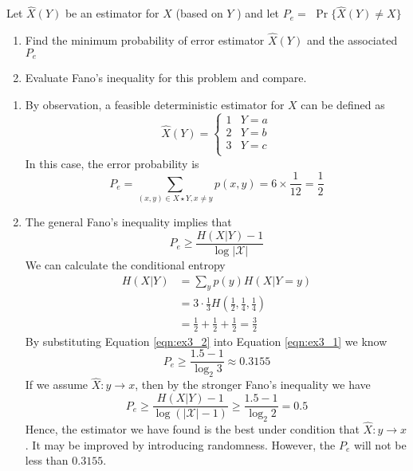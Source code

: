 \begin{exercise}[Fano]
{  Let $\hat{X}(Y)$ be an estimator for $X$ (based on $Y$ ) and let $P_{e}=$ $\operatorname{Pr}\{\hat{X}(Y) \neq X\}$
  \begin{enumerate}
    \item Find the minimum probability of error estimator $\hat{X}(Y)$ and the associated $P_{e}$
    \item Evaluate Fano's inequality for this problem and compare.
  \end{enumerate}
  }
  \begin{solution}
    \begin{enumerate}
      \item {
        By observation, a feasible deterministic estimator for $X$ can be defined as
        \begin{equation}
          \hat{X}(Y) = \left\{\begin{array}{ll}
            1 & Y = a \\
            2 & Y = b \\
            3 & Y = c \\           
          \end{array}  \right.
        \end{equation}
        In this case, the error probability is 
        $$ P_e = \sum_{(x,y)\in {X \star Y}, x \neq y} p(x,y) = 6 \times \frac{1}{12} = \frac{1}{2}$$
      }
      \item {
        The general Fano's inequality implies that
      \begin{equation}P_{e} \geqslant \frac{H(X | Y)-1}{\log |\mathcal{X}|} \label{eqn:ex3_1}\end{equation}
        We can calculate the conditional entropy
        \begin{equation}
          \begin{aligned}
            H(X|Y) &= \sum_{y} p(y) H(X|Y=y) \\
            &= 3 \cdot \frac{1}{3} H(\frac{1}{2},\frac{1}{4},\frac{1}{4}) \\
            &=  \frac{1}{2} +  \frac{1}{2} +  \frac{1}{2} = \frac{3}{2}
          \end{aligned}
          \label{eqn:ex3_2}
        \end{equation}
        By substituting Equation \ref{eqn:ex3_2} into Equation \ref{eqn:ex3_1} we know
        $$P_e \ge \frac{1.5 - 1}{\log_2 3} \approx 0.3155$$
        If we assume $\hat{X}: y \rightarrow x$, then by the stronger Fano's inequality we have
        $$P_e \ge \frac{H(X | Y)-1}{\log (|\mathcal{X}|-1)} \ge \frac{1.5 - 1}{\log_2 2} = 0.5$$
        Hence, the estimator we have found is the best under condition that $\hat{X}: y \rightarrow x$. It may be improved by introducing randomness. However, the $P_e$ will not be less than $0.3155$.
      }
    \end{enumerate}
  \end{solution}
  \label{ex3}
\end{exercise}


